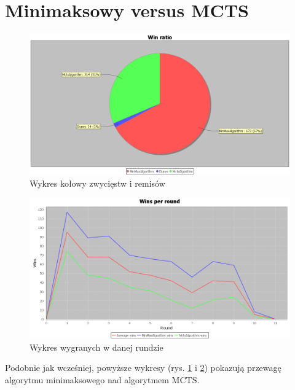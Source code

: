 \section{Minimaksowy versus MCTS}

\begin{figure}[H]
	\centering
	\includegraphics[width=\textwidth]{Resources/MirrorMmVsMcts/MmVsMctsWin.PNG}
	\caption{Wykres kołowy zwycięstw i remisów} 
	\label{fig:MmVsMctsWin}
\end{figure}

\begin{figure}[H]
	\centering
	\includegraphics[width=\textwidth]{Resources/MirrorMmVsMcts/MmVsMctsRoundWin.PNG}
	\caption{Wykres wygranych w danej rundzie} 
	\label{fig:MmVsMctsRoundWin}
\end{figure}

Podobnie jak wcześniej, powyższe wykresy (rys. \ref{fig:MmVsMctsWin} i \ref{fig:MmVsMctsRoundWin}) pokazują przewagę algorytmu minimaksowego nad algorytmem MCTS.

